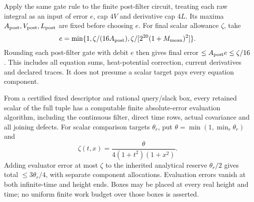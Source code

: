Apply the same gate rule to the finite post-filter circuit, treating
each raw integral as an input of error $e$, cap $4V$ and derivative
cap $4L$. Its maxima $A_{\rm post},V_{\rm post},L_{\rm post}$
are fixed before choosing $e$. For final scalar allowance $\zeta$, take
\begin{equation}
 e=\min\{1,\zeta/(16A_{\rm post}),
                 \zeta/[2^{20}(1+M_{\rm mean})^2]\}.
 \label{eq:ev-post-allocation}
\end{equation}
Rounding each post-filter gate with debit $e$ then gives final error
$\le A_{\rm post}e\le\zeta/16$. This includes all equation sums,
heat-potential correction, current derivatives and declared traces.
It does not presume a scalar target pays every equation component.

\begin{theorem}\label{thm:complete-evaluator}
From a certified fixed descriptor and rational query/slack box, every
retained scalar of the full tuple has a computable finite absolute-error
evaluation algorithm, including the continuous filter, direct time
rows, actual covariance and all joining defects. For scalar comparison
targets $\theta_r$, put $\theta=\min(1,\min_r\theta_r)$ and
\begin{equation}
 \zeta(t,x)=\frac{\theta}{4(1+t^2)(1+x^2)}.
 \label{eq:ev-endpoint-schedule}
\end{equation}
Adding evaluator error at most $\zeta$ to the inherited analytical
reserve $\theta_r/2$ gives total $\le3\theta_r/4$, with separate
component allocations. Evaluation errors vanish at both infinite-time
and height ends. Boxes may be placed at every real height and time;
no uniform finite work budget over those boxes is asserted.
\end{theorem}

